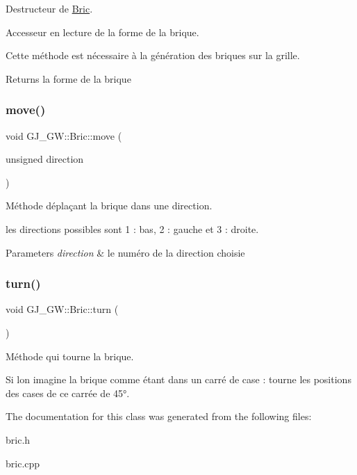 Destructeur de \hyperlink{class_g_j___g_w_1_1_bric}{Bric}. 

Accesseur en lecture de la forme de la brique.

Cette méthode est nécessaire à la génération des briques sur la grille.

\begin{DoxyReturn}{Returns}
la forme de la brique 
\end{DoxyReturn}
\hypertarget{class_g_j___g_w_1_1_bric_abe976548141bc46efc67d6ea6d0fa3ed}{}\label{class_g_j___g_w_1_1_bric_abe976548141bc46efc67d6ea6d0fa3ed} 
\subsubsection{\texorpdfstring{move()}{move()}}
{\footnotesize\ttfamily void G\+J\+\_\+\+G\+W\+::\+Bric\+::move (\begin{DoxyParamCaption}\item[{unsigned}]{direction }\end{DoxyParamCaption})}



Méthode déplaçant la brique dans une direction. 

les directions possibles sont 1 \+: bas, 2 \+: gauche et 3 \+: droite.


\begin{DoxyParams}{Parameters}
{\em direction} & le numéro de la direction choisie \\
\hline
\end{DoxyParams}
\hypertarget{class_g_j___g_w_1_1_bric_ac1f67934cba67a59e6917fd0a8af009b}{}\label{class_g_j___g_w_1_1_bric_ac1f67934cba67a59e6917fd0a8af009b} 
\subsubsection{\texorpdfstring{turn()}{turn()}}
{\footnotesize\ttfamily void G\+J\+\_\+\+G\+W\+::\+Bric\+::turn (\begin{DoxyParamCaption}{ }\end{DoxyParamCaption})}



Méthode qui tourne la brique. 

Si l\textquotesingle{}on imagine la brique comme étant dans un carré de case \+: tourne les positions des cases de ce carrée de 45°. 

The documentation for this class was generated from the following files\+:\begin{DoxyCompactItemize}
\item 
bric.\+h\item 
bric.\+cpp\end{DoxyCompactItemize}
